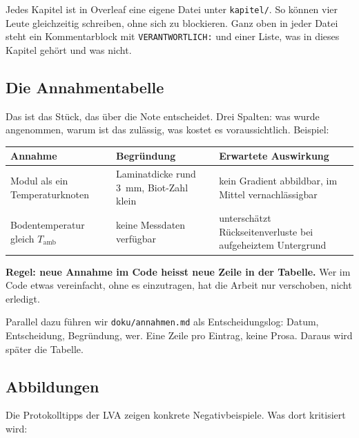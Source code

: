 \documentclass[11pt,a4paper]{scrartcl}
\newcommand{\Tamb}{T_\mathrm{amb}}
\begin{document}
Jedes Kapitel ist in Overleaf eine eigene Datei unter \texttt{kapitel/}.
So k\"onnen vier Leute gleichzeitig schreiben, ohne sich zu blockieren. Ganz
oben in jeder Datei steht ein Kommentarblock mit \texttt{VERANTWORTLICH:}
und einer Liste, was in dieses Kapitel geh\"ort und was nicht.

\subsection{Die Annahmentabelle}

Das ist das St\"uck, das \"uber die Note entscheidet. Drei Spalten: was wurde
angenommen, warum ist das zul\"assig, was kostet es voraussichtlich. Beispiel:

\begin{center}
\small
\begin{tabular}{p{} p{} p{}}
  \toprule
  Annahme & Begr\"undung & Erwartete Auswirkung \\
  \midrule
  Modul als ein Temperaturknoten &
    Laminatdicke rund \SI{3}{\milli\metre}, Biot-Zahl klein &
    kein Gradient abbildbar, im Mittel vernachl\"assigbar \\
  Bodentemperatur gleich $\Tamb$ &
    keine Messdaten verf\"ugbar &
    untersch\"atzt R\"uckseitenverluste bei aufgeheiztem Untergrund \\
  \bottomrule
\end{tabular}
\end{center}

\begin{merke}
\textbf{Regel: neue Annahme im Code heisst neue Zeile in der Tabelle.} Wer
im Code etwas vereinfacht, ohne es einzutragen, hat die Arbeit nur
verschoben, nicht erledigt.
\end{merke}

Parallel dazu f\"uhren wir \texttt{doku/annahmen.md} als Entscheidungslog:
Datum, Entscheidung, Begr\"undung, wer. Eine Zeile pro Eintrag, keine Prosa.
Daraus wird sp\"ater die Tabelle.

\subsection{Abbildungen}

Die Protokolltipps der LVA zeigen konkrete Negativbeispiele. Was dort
kritisiert wird:
\end{document}
